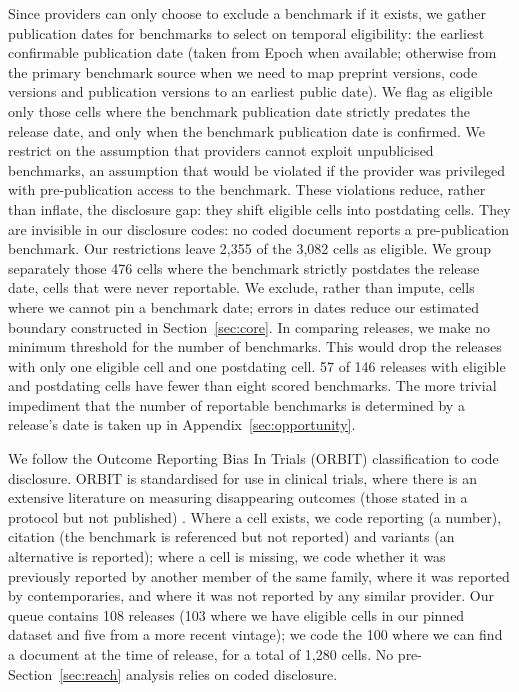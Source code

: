 Since providers can only choose to exclude a benchmark if it exists, we gather publication dates for benchmarks to select on temporal eligibility: the earliest confirmable publication date (taken from Epoch when available; otherwise from the primary benchmark source when we need to map preprint versions, code versions and publication versions to an earliest public date). We flag as eligible only those cells where the benchmark publication date strictly predates the release date, and only when the benchmark publication date is confirmed. We restrict on the assumption that providers cannot exploit unpublicised benchmarks, an assumption that would be violated if the provider was privileged with pre-publication access to the benchmark. These violations reduce, rather than inflate, the disclosure gap: they shift eligible cells into postdating cells. They are invisible in our disclosure codes: no coded document reports a pre-publication benchmark. Our restrictions leave 2,355 of the 3,082 cells as eligible. We group separately those 476 cells where the benchmark strictly postdates the release date, cells that were never reportable. We exclude, rather than impute, cells where we cannot pin a benchmark date; errors in dates reduce our estimated boundary constructed in Section~\ref{sec:core}. In comparing releases, we make no minimum threshold for the number of benchmarks. This would drop the releases with only one eligible cell and one postdating cell. 57 of 146 releases with eligible and postdating cells have fewer than eight scored benchmarks. The more trivial impediment that the number of reportable benchmarks is determined by a release's date is taken up in Appendix~\ref{sec:opportunity}.

We follow the Outcome Reporting Bias In Trials (ORBIT) classification to code disclosure. ORBIT is standardised for use in clinical trials, where there is an extensive literature on measuring disappearing outcomes (those stated in a protocol but not published) \citep{chan2004,kirkham2010,dwan2013}. Where a cell exists, we code reporting (a number), citation (the benchmark is referenced but not reported) and variants (an alternative is reported); where a cell is missing, we code whether it was previously reported by another member of the same family, where it was reported by contemporaries, and where it was not reported by any similar provider. Our queue contains 108 releases (103 where we have eligible cells in our pinned dataset and five from a more recent vintage); we code the 100 where we can find a document at the time of release, for a total of 1,280 cells. No pre-Section~\ref{sec:reach} analysis relies on coded disclosure.

